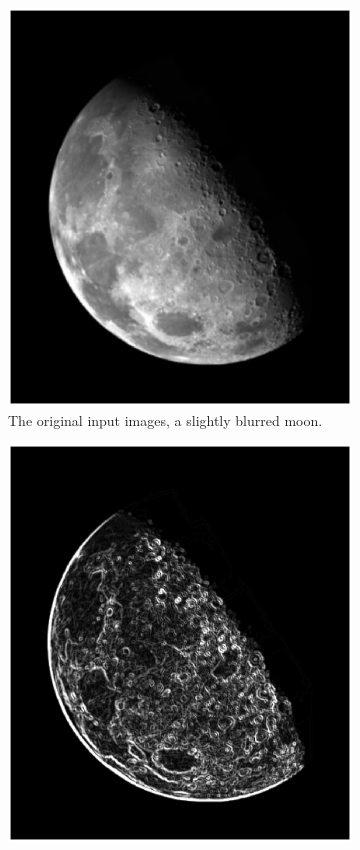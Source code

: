 \begin{figure}[!Hbt]
\centering
 \begin{subfigure}[b]{0.45\textwidth}
  \includegraphics[width=\textwidth]{moonOriginal.eps}
  \caption{The original input images, a slightly blurred moon. \newline ~\newline}
  \label{fig:moonOrig}
 \end{subfigure}
 \begin{subfigure}[b]{0.45\textwidth}
  \includegraphics[width=\textwidth]{moonSharpened.eps}

\end{subfigure}
\end{figure}
